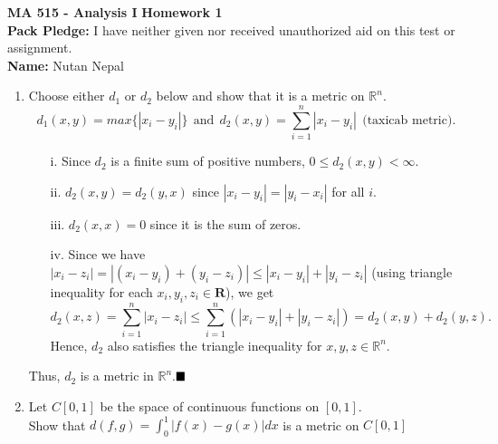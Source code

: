 \documentclass[12pt]{article}
\newcommand{\qed}{$\hfill\blacksquare$}
\newcommand{\ds}{\displaystyle}
\begin{document}
{\large \textbf{MA 515 - Analysis I}}\hfill
\textbf{Homework 1} \\
{\bf Pack Pledge:} I have neither given nor received unauthorized aid on this
test or assignment.\\
{\bf Name:} Nutan Nepal\hfill \\
 \underline{}\hrulefill
\vspace{.1in}

\begin{enumerate}

\item Choose either $d_1$ or $d_2$ below and show that it is a metric on $\mathbb{R}^n$. 
 $$d_1(x,y) = max\{|x_i-y_i|\} \ \ \text{and} \ \ d_2(x,y) = \sum_{i=1}^n |x_i - y_i| \ \ \text{(taxicab metric)}.$$
\begin{mybox}

  \begin{enumerate}
    \item[i.]
      Since $d_2$ is a finite sum of positive numbers,
      $0\leq d_2(x,y)<\infty$.
    \item[ii.]
      $d_2(x,y)=d_2(y,x)$ since $|x_i-y_i|=|y_i-x_i|$
      for all $i$.
    \item[iii.]
      $d_2(x,x)=0$ since it is the sum of zeros.
    \item[iv.]
      Since we have $|x_i-z_i|=|(x_i-y_i)+(y_i-z_i)|
      \leq |x_i-y_i|+|y_i-z_i|$ (using triangle inequality
      for each $x_i, y_i, z_i \in \mathbf{R}$), we get
      $$d_2(x,z)=\sum_{i=1}^n |x_i - z_i|\leq
      \sum_{i=1}^n{\left(|x_i - y_i|+|y_i-z_i|\right)}
      =d_2(x,y)+d_2(y,z).$$
      Hence, $d_2$ also satisfies the triangle inequality
      for $x,y,z\in \mathbb{R}^n$.   
  \end{enumerate}
  Thus, $d_2$ is a metric in $\mathbb{R}^n$.\qed
\end{mybox}

 \item Let $C[0,1]$ be the space of continuous functions on $[0,1]$. \\
 Show that $\ds d(f,g) = \int_0^1|f(x) - g(x)| dx$ is a metric on $C[0,1]$
 \begin{mybox}


\end{mybox}
\end{enumerate}
\end{document}
